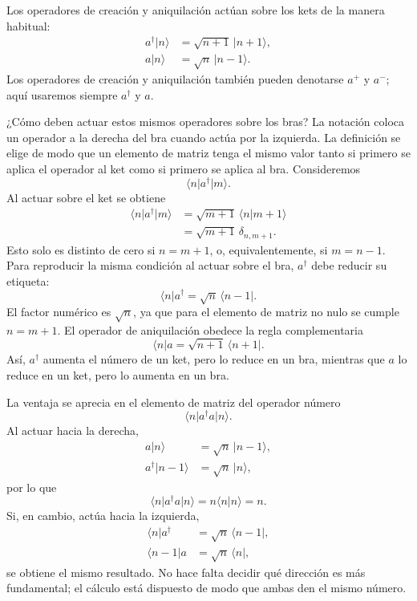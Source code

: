 Los operadores de creación y aniquilación actúan sobre los kets de la manera habitual:
\begin{align}
a^\dagger\lvert n\rangle&=\sqrt{n+1}\,\lvert n+1\rangle,\\
a\lvert n\rangle&=\sqrt n\,\lvert n-1\rangle.
\end{align}
Los operadores de creación y aniquilación también pueden denotarse \(a^+\) y \(a^-\); aquí usaremos siempre \(a^\dagger\) y \(a\).

¿Cómo deben actuar estos mismos operadores sobre los bras? La notación coloca un operador a la derecha del bra cuando actúa por la izquierda. La definición se elige de modo que un elemento de matriz tenga el mismo valor tanto si primero se aplica el operador al ket como si primero se aplica al bra. Consideremos
\begin{equation}
\langle n\rvert a^\dagger\lvert m\rangle.
\end{equation}
Al actuar sobre el ket se obtiene
\begin{align}
\langle n\rvert a^\dagger\lvert m\rangle
&=\sqrt{m+1}\,\langle n\vert m+1\rangle\\
&=\sqrt{m+1}\,\delta_{n,m+1}.
\end{align}
Esto solo es distinto de cero si \(n=m+1\), o, equivalentemente, si \(m=n-1\). Para reproducir la misma condición al actuar sobre el bra, \(a^\dagger\) debe reducir su etiqueta:
\begin{equation}
\langle n\rvert a^\dagger
=\sqrt n\,\langle n-1\rvert.
\end{equation}
El factor numérico es \(\sqrt n\), ya que para el elemento de matriz no nulo se cumple \(n=m+1\). El operador de aniquilación obedece la regla complementaria
\begin{equation}
\langle n\rvert a
=\sqrt{n+1}\,\langle n+1\rvert.
\end{equation}
Así, \(a^\dagger\) aumenta el número de un ket, pero lo reduce en un bra, mientras que \(a\) lo reduce en un ket, pero lo aumenta en un bra.

La ventaja se aprecia en el elemento de matriz del operador número
\begin{equation}
\langle n\rvert a^\dagger a\lvert n\rangle.
\end{equation}
Al actuar hacia la derecha,
\begin{align}
a\lvert n\rangle&=\sqrt n\,\lvert n-1\rangle,\\
a^\dagger\lvert n-1\rangle&=\sqrt n\,\lvert n\rangle,
\end{align}
por lo que
\begin{equation}
\langle n\rvert a^\dagger a\lvert n\rangle
=n\langle n\vert n\rangle=n.
\end{equation}
Si, en cambio, actúa hacia la izquierda,
\begin{align}
\langle n\rvert a^\dagger&=\sqrt n\,\langle n-1\rvert,\\
\langle n-1\rvert a&=\sqrt n\,\langle n\rvert,
\end{align}
se obtiene el mismo resultado. No hace falta decidir qué dirección es más fundamental; el cálculo está dispuesto de modo que ambas den el mismo número.

